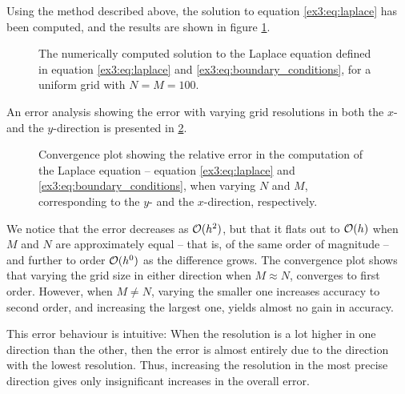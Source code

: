 Using the method described above, the solution to equation \ref{ex3:eq:laplace} has been computed, and the results are shown in figure \ref{ex3:fig:heat_map}.
\begin{figure}[tbp]
    \centering
    \caption{The numerically computed solution to the Laplace equation defined in equation \eqref{ex3:eq:laplace} and \eqref{ex3:eq:boundary_conditions}, for a uniform grid with $N = M = 100$.}
    \label{ex3:fig:heat_map}
\end{figure}
An error analysis showing the error with varying grid resolutions in both the $x$- and the $y$-direction is presented in \ref{ex3:fig:convergence_plot}.
\begin{figure}[tbp]
    \centering
    
    \caption{Convergence plot showing the relative error in the computation of the Laplace equation -- equation \eqref{ex3:eq:laplace} and \eqref{ex3:eq:boundary_conditions}, when varying $N$ and $M$, corresponding to the $y$- and the $x$-direction, respectively.}
    \label{ex3:fig:convergence_plot}
\end{figure}
We notice that the error decreases as $\mathcal{O}(h^2)$, but that it flats out to $\mathcal{O}(h)$ when $M$ and $N$ are approximately equal -- that is, of the same order of magnitude -- and further to order $\mathcal{O}(h^0)$ as the difference grows.
The convergence plot shows that varying the grid size in either direction when $M \approx N$, converges to first order.
However, when $M \neq N$, varying the smaller one increases accuracy to second order, and increasing the largest one, yields almost no gain in accuracy.

This error behaviour is intuitive: When the resolution is a lot higher in one direction than the other, then the error is almost entirely due to the direction with the lowest resolution.
Thus, increasing the resolution in the most precise direction gives only insignificant increases in the overall error.
